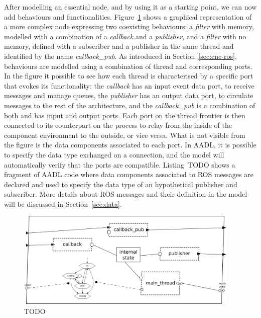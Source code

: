 After modelling an essential node, and by using it as a starting point, we can now add behaviours and functionalities. Figure~\ref{fig:sample-node} shows a graphical representation of a more complex node expressing two coexisting behaviours: a \textit{filter} with memory, modelled with a combination of a \textit{callback} and a \textit{publisher}, and a \textit{filter} with no memory, defined with a subscriber and a publisher in the same thread and identified by the name \textit{callback\_pub}. As introduced in Section~\ref{sec:cnc-ros}, behaviours are modelled using a combination of thread and corresponding ports. In the figure it possible to see how each thread is characterised by a specific port that evokes its functionality: the \textit{callback} has an input event data port, to receive messages and manage queues, the \textit{publisher} has an output data port, to circulate messages to the rest of the architecture, and the \textit{callback\_pub} is a combination of both and has input and output ports. Each port on the thread frontier is then connected to its counterpart on the process to relay from the inside of the component environment to the outside, or vice versa. What is not visible from the figure is the data components associated to each port. In AADL, it is possible to specify the data type exchanged on a connection, and the model will automatically verify that the ports are compatible. Listing~TODO shows a fragment of AADL code where data components associated to ROS messages are declared and used to specify the data type of an hypothetical publisher and subscriber. More details about ROS messages and their definition in the model will be discussed in Section~\ref{sec:data}.

\begin{figure}[t]
    \centering
    \includegraphics[width=0.95\textwidth]{gfx/sample_node}
    \caption{TODO}\label{fig:sample-node}
\end{figure}

